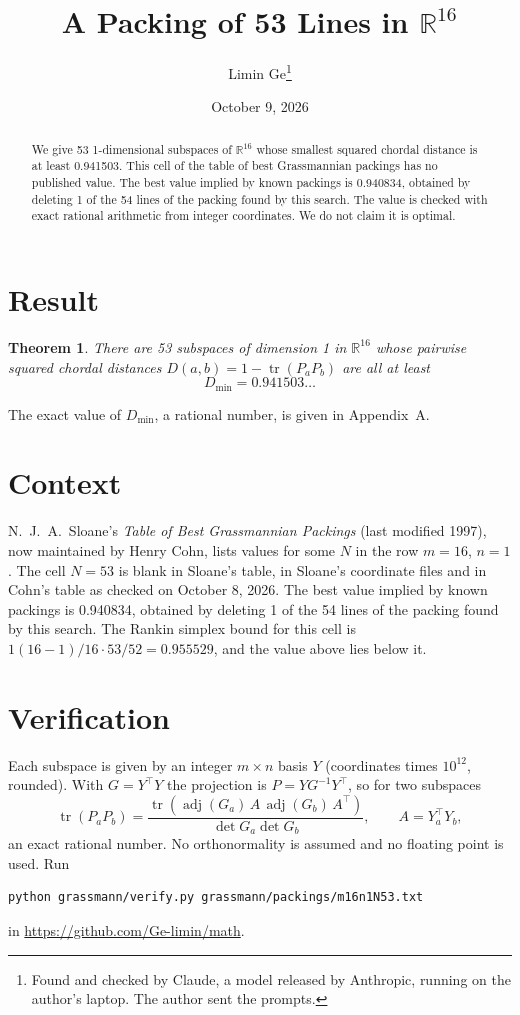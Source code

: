 \documentclass[11pt,a4paper]{article}
\title{A Packing of 53 Lines in $\mathbb{R}^{16}$}
\author{Limin Ge\thanks{Found and checked by Claude, a model released by Anthropic, running on the author's laptop. The author sent the prompts.}}
\date{October 9, 2026}
\newtheorem*{theorem}{Theorem}
\begin{document}
\maketitle
\begin{abstract}
We give 53 1-dimensional subspaces of $\mathbb{R}^{16}$ whose smallest squared chordal distance is at least 0.941503. This cell of the table of best Grassmannian packings has no published value. The best value implied by known packings is 0.940834, obtained by deleting 1 of the 54 lines of the packing found by this search. The value is checked with exact rational arithmetic from integer coordinates. We do not claim it is optimal.
\end{abstract}

\section{Result}
\begin{theorem}
There are 53 subspaces of dimension 1 in $\mathbb{R}^{16}$ whose pairwise squared chordal distances $D(a,b) = 1 - \operatorname{tr}(P_aP_b)$ are all at least
\[ D_{\min} = 0.941503\ldots \]
\end{theorem}
The exact value of $D_{\min}$, a rational number, is given in Appendix~A.


\section{Context}
N.~J.~A.~Sloane's \emph{Table of Best Grassmannian Packings} (last modified 1997), now maintained by Henry Cohn, lists values for some $N$ in the row $m=16$, $n=1$. The cell $N=53$ is blank in Sloane's table, in Sloane's coordinate files and in Cohn's table as checked on October 8, 2026. The best value implied by known packings is 0.940834, obtained by deleting 1 of the 54 lines of the packing found by this search. The Rankin simplex bound for this cell is $1(16-1)/16\cdot 53/52 = 0.955529$, and the value above lies below it.


\section{Verification}
Each subspace is given by an integer $m\times n$ basis $Y$ (coordinates times $10^{12}$, rounded). With $G=Y^\top Y$ the projection is $P=YG^{-1}Y^\top$, so for two subspaces
\[ \operatorname{tr}(P_aP_b)=\frac{\operatorname{tr}(\operatorname{adj}(G_a)\,A\,\operatorname{adj}(G_b)\,A^\top)}{\det G_a\det G_b},\qquad A=Y_a^\top Y_b, \]
an exact rational number. No orthonormality is assumed and no floating point is used. Run
\begin{verbatim}
python grassmann/verify.py grassmann/packings/m16n1N53.txt
\end{verbatim}
in \url{https://github.com/Ge-limin/math}.
\end{document}
